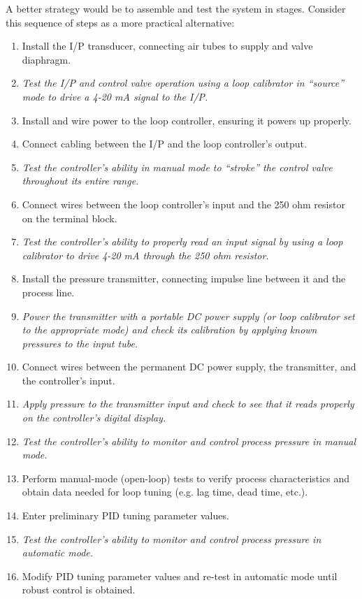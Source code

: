 \filbreak

A better strategy would be to assemble and test the system in stages.  Consider this sequence of steps as a more practical alternative:

\begin{enumerate}
\item Install the I/P transducer, connecting air tubes to supply and valve diaphragm.
\item \textit{Test the I/P and control valve operation using a loop calibrator in ``source'' mode to drive a 4-20 mA signal to the I/P.}
\item Install and wire power to the loop controller, ensuring it powers up properly.
\item Connect cabling between the I/P and the loop controller's output.
\item \textit{Test the controller's ability in manual mode to ``stroke'' the control valve throughout its entire range.}
\item Connect wires between the loop controller's input and the 250 ohm resistor on the terminal block.
\item \textit{Test the controller's ability to properly read an input signal by using a loop calibrator to drive 4-20 mA through the 250 ohm resistor.}
\item Install the pressure transmitter, connecting impulse line between it and the process line. 
\item \textit{Power the transmitter with a portable DC power supply (or loop calibrator set to the appropriate mode) and check its calibration by applying known pressures to the input tube.}
\item Connect wires between the permanent DC power supply, the transmitter, and the controller's input.
\item \textit{Apply pressure to the transmitter input and check to see that it reads properly on the controller's digital display.}
\item \textit{Test the controller's ability to monitor and control process pressure in manual mode.}
\item Perform manual-mode (open-loop) tests to verify process characteristics and obtain data needed for loop tuning (e.g. lag time, dead time, etc.).
\item Enter preliminary PID tuning parameter values.
\item \textit{Test the controller's ability to monitor and control process pressure in automatic mode.}
\item Modify PID tuning parameter values and re-test in automatic mode until robust control is obtained.
\end{enumerate}

